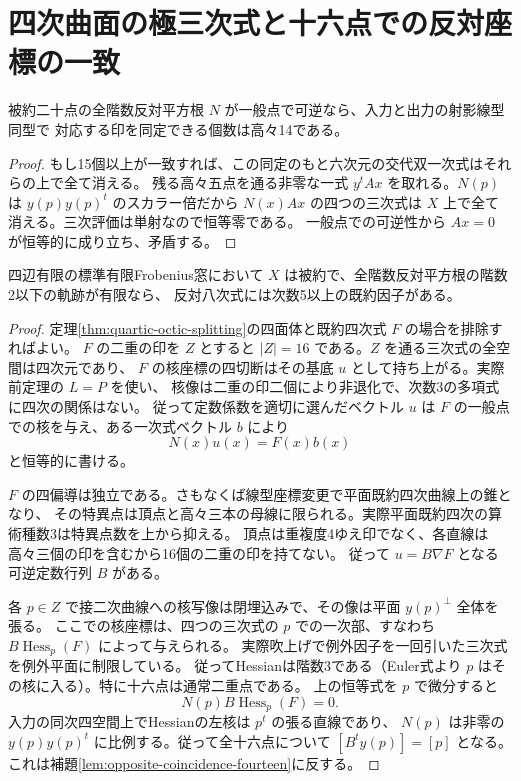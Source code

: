 \section{四次曲面の極三次式と十六点での反対座標の一致}
\label{sec:exclude-tetrahedral-quartic}
\begin{lemma}\label{lem:opposite-coincidence-fourteen}
被約二十点の全階数反対平方根 $N$ が一般点で可逆なら、入力と出力の射影線型同型で
対応する印を同定できる個数は高々14である。
\end{lemma}
\begin{proof}
もし15個以上が一致すれば、この同定のもと六次元の交代双一次式はそれらの上で全て消える。
残る高々五点を通る非零な一式 $y^t A x$ を取れる。$N(p)$ は $y(p)y(p)^t$ のスカラー倍だから
$N(x)Ax$ の四つの三次式は $X$ 上で全て消える。三次評価は単射なので恒等零である。
一般点での可逆性から $Ax=0$ が恒等的に成り立ち、矛盾する。
\end{proof}
\begin{theorem}\label{thm:exclude-tetrahedral-quartic}
四辺有限の標準有限Frobenius窓において $X$ は被約で、全階数反対平方根の階数2以下の軌跡が有限なら、
反対八次式には次数5以上の既約因子がある。
\end{theorem}
\begin{proof}
定理\ref{thm:quartic-octic-splitting}の四面体と既約四次式 $F$ の場合を排除すればよい。
$F$ の二重の印を $Z$ とすると $|Z|=16$ である。$Z$ を通る三次式の全空間は四次元であり、
$F$ の核座標の四切断はその基底 $u$ として持ち上がる。実際前定理の $L=P$ を使い、
核像は二重の印二個により非退化で、次数3の多項式に四次の関係はない。
従って定数係数を適切に選んだベクトル $u$ は $F$ の一般点での核を与え、ある一次式ベクトル $b$ により
\[
                            N(x)u(x)=F(x)b(x)
\]
と恒等的に書ける。

$F$ の四偏導は独立である。さもなくば線型座標変更で平面既約四次曲線上の錐となり、
その特異点は頂点と高々三本の母線に限られる。実際平面既約四次の算術種数3は特異点数を上から抑える。
頂点は重複度4ゆえ印でなく、各直線は高々三個の印を含むから16個の二重の印を持てない。
従って $u=B\nabla F$ となる可逆定数行列 $B$ がある。

各 $p\in Z$ で接二次曲線への核写像は閉埋込みで、その像は平面 $y(p)^\perp$ 全体を張る。
ここでの核座標は、四つの三次式の $p$ での一次部、すなわち $B\operatorname{Hess}_p(F)$ によって与えられる。
実際吹上げで例外因子を一回引いた三次式を例外平面に制限している。
従ってHessianは階数3である（Euler式より $p$ はその核に入る）。特に十六点は通常二重点である。
上の恒等式を $p$ で微分すると
\[
                   N(p)B\operatorname{Hess}_p(F)=0 .
\]
入力の同次四空間上でHessianの左核は $p^t$ の張る直線であり、
$N(p)$ は非零の $y(p)y(p)^t$ に比例する。従って全十六点について $[B^t y(p)]=[p]$ となる。
これは補題\ref{lem:opposite-coincidence-fourteen}に反する。
\end{proof}
